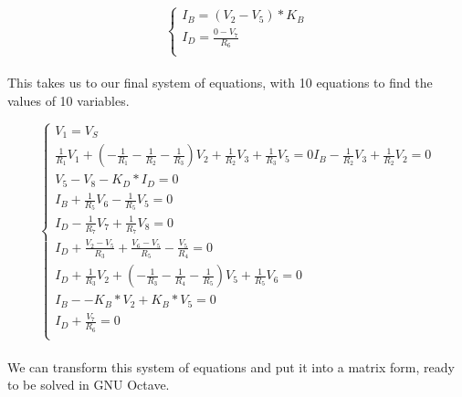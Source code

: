 \[
\left\{\begin{matrix}
I_B = (V_2-V_5)*K_B \\
I_D = \frac{0-V_7}{R_6} \\
\end{matrix}\right.
\]

\paragraph{}
This takes us to our final system of equations, with 10 equations to find the values of 10 variables.

\[
\left\{\begin{matrix}
V_1 = V_S\\
\frac{1}{R_1}V_1 + (-\frac{1}{R_1} -\frac{1}{R_2} -\frac{1}{R_3})V_2 +\frac{1}{R_2}V_3 + \frac{1}{R_3}V_5 = 0
I_B - \frac{1}{R_2}V_3 +\frac{1}{R_2}V_2 = 0\\
V_5 - V_8 - K_D*I_D = 0\\
I_B + \frac{1}{R_5}V_6 -\frac{1}{R_5}V_5= 0\\
I_D - \frac{1}{R_7}V_7 + \frac{1}{R_7}V_8 = 0\\
I_D + \frac{V_2-V_5}{R_3} + \frac{V_6-V_5}{R_5} - \frac{V_5}{R_4} = 0\\

I_D + \frac{1}{R_3}V_2 + (-\frac{1}{R_3} -\frac{1}{R_4} -\frac{1}{R_5})V_5 + \frac{1}{R_5}V_6 = 0\\

I_B - -K_B*V_2 + K_B*V_5 = 0\\
I_D + \frac{V_7}{R_6} = 0\\
\end{matrix}\right.
\]

\paragraph{}
We can transform this system of equations and put it into a matrix form, ready to be solved in GNU Octave.

